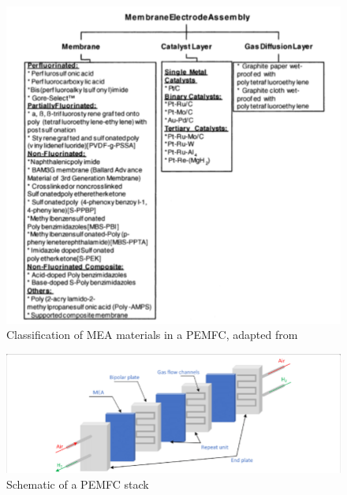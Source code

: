 \begin{figure}[H]
    \includegraphics[scale=0.7]{figures/MEA.png}
    \caption{Classification of MEA materials in a PEMFC, adapted from \cite{Mehta2003}}
    \label{fig:MEA}
\end{figure}

\begin{figure}[H]
    \includegraphics[scale=0.5]{figures/PEMFCstack.png}
    \caption{Schematic of a PEMFC stack \cite{Li2019}}
    \label{fig:pemfcstack}
\end{figure}


